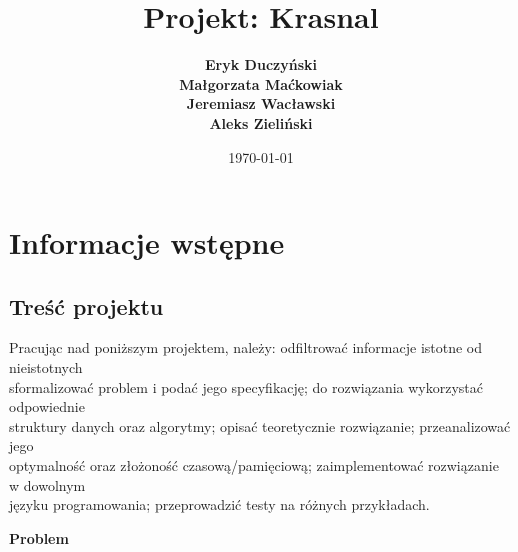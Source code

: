 \documentclass{article}
\title{\textbf{Projekt: Krasnal}}
\author{\textbf{Eryk Duczyński} \\ \textbf{Małgorzata Maćkowiak} \\ \textbf{Jeremiasz Wacławski} \\ \textbf{Aleks Zieliński}}
\date{\today}
\begin{document}
\maketitle

\newpage
\tableofcontents
\newpage

\section{Informacje wstępne}

\subsection{Treść projektu}
Pracując nad poniższym projektem, należy: odfiltrować informacje istotne od nieistotnych \\ sformalizować problem i podać jego specyfikację; do rozwiązania wykorzystać odpowiednie \\ struktury danych oraz algorytmy; opisać teoretycznie rozwiązanie; przeanalizować jego \\ optymalność oraz złożoność czasową/pamięciową; zaimplementować rozwiązanie w dowolnym \\ języku programowania; przeprowadzić testy na różnych przykładach. \\
\centerline{\textbf{Problem}} \\
\end{document}
